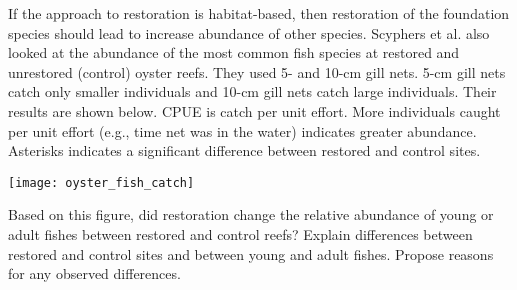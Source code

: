 If the approach to restoration is habitat-based, then restoration of the foundation species should lead to increase abundance of other species. Scyphers et al. also looked at the abundance of the most common fish species at restored and unrestored (control) oyster reefs.  They used 5- and 10-cm gill nets. 5-cm gill nets catch only smaller individuals and 10-cm gill nets catch large individuals. Their results are shown below. CPUE is catch per unit effort. More individuals caught per unit effort (e.g., time net was in the water) indicates greater abundance. Asterisks indicates a significant difference between restored and control sites.

\texttt{[image: oyster\_fish\_catch]}

\newpage

\question[5]\label{question:project}
Based on this figure, did restoration change the relative abundance of young or adult fishes between restored and control reefs? Explain differences between restored and control sites and between young and adult fishes. Propose reasons for any observed differences.

